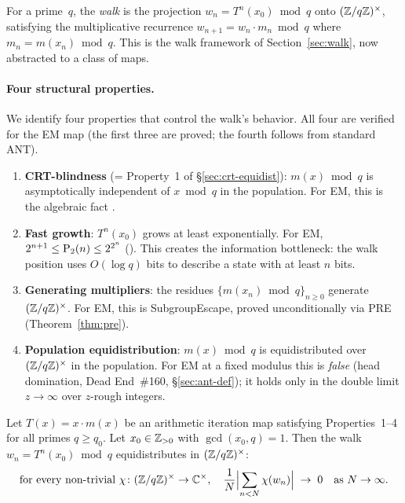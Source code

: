 \noindent For a prime~$q$, the \emph{walk} is the projection
$w_n = T^n(x_0) \bmod q$ onto $(\mathbb{Z}/q\mathbb{Z})^\times$, satisfying the
multiplicative recurrence $w_{n+1} = w_n \cdot m_n \bmod q$ where
$m_n = m(x_n) \bmod q$.  This is the walk framework of
Section~\ref{sec:walk}, now abstracted to a class of maps.

\paragraph{Four structural properties.}
We identify four properties that control the walk's behavior.  All four
are verified for the EM map (the first three are proved; the fourth
follows from standard ANT).

\begin{enumerate}[nosep]
\item \textbf{CRT-blindness} (= Property~1 of \S\ref{sec:crt-equidist}):
  $m(x) \bmod q$ is asymptotically independent of $x \bmod q$ in the
  population.  For EM, this is the algebraic fact
  .

\item \textbf{Fast growth}: $T^n(x_0)$ grows at least exponentially.
  For EM, $2^{n+1}\le\mathrm{P}_{2}(n) \le 2^{2^n}$
  ().
  This creates the information bottleneck: the walk position uses
  $O(\log q)$ bits to describe a state with at least $n$ bits.

\item \textbf{Generating multipliers}: the residues
  $\{m(x_n) \bmod q\}_{n \geq 0}$ generate $(\mathbb{Z}/q\mathbb{Z})^\times$.
  For EM, this is SubgroupEscape, proved unconditionally via PRE
  (Theorem~\ref{thm:pre}).

\item \textbf{Population equidistribution}: $m(x) \bmod q$ is
  equidistributed over $(\mathbb{Z}/q\mathbb{Z})^\times$ in the population.  For EM
  at a fixed modulus this is \emph{false} (head domination, Dead
  End~\#160, \S\ref{sec:ant-def}); it holds only in the double limit
  $z \to \infty$ over $z$-rough integers.
\end{enumerate}

\begin{conjecture}
\label{conj:naad}
Let $T(x) = x \cdot m(x)$ be an arithmetic iteration map satisfying
Properties~1--4 for all primes $q \geq q_0$.  Let $x_0 \in \mathbb{Z}_{>0}$
with $\gcd(x_0, q) = 1$.  Then the walk $w_n = T^n(x_0) \bmod q$
equidistributes in $(\mathbb{Z}/q\mathbb{Z})^\times$:
\[
  \text{for every non-trivial } \chi \colon (\mathbb{Z}/q\mathbb{Z})^\times \to
  \mathbb{C}^\times,\quad
  \frac{1}{N}\Bigl|\sum_{n < N} \chi(w_n)\Bigr| \;\to\; 0
  \quad\text{as } N \to \infty.
\]
\end{conjecture}

